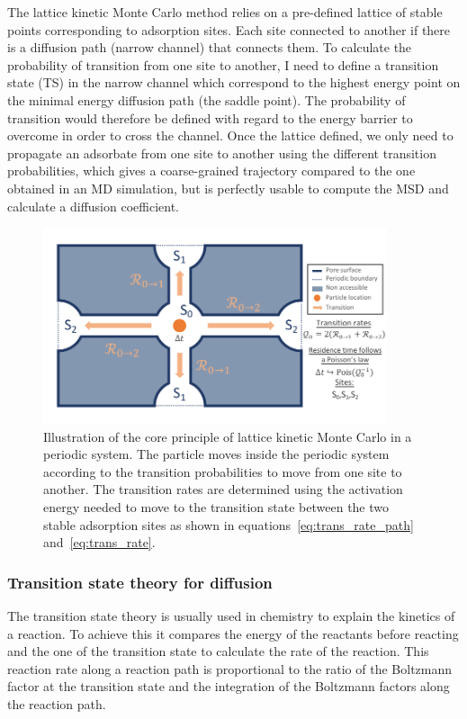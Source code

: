 \documentclass[main]{subfiles}
\begin{document}
The lattice kinetic Monte Carlo method relies on a pre-defined lattice of stable points corresponding to adsorption sites. Each site connected to another if there is a diffusion path (narrow channel) that connects them. To calculate the probability of transition from one site to another, I need to define a transition state (TS) in the narrow channel which correspond to the highest energy point on the minimal energy diffusion path (the saddle point). The probability of transition would therefore be defined with regard to the energy barrier to overcome in order to cross the channel. Once the lattice defined, we only need to propagate an adsorbate from one site to another using the different transition probabilities, which gives a coarse-grained trajectory compared to the one obtained in an MD simulation, but is perfectly usable to compute the MSD and calculate a diffusion coefficient.


\begin{figure}[ht]
  \centering
    \includegraphics[width=0.9\textwidth]{figures/5-diffusion/kinetic_MC.pdf}
    \caption{Illustration of the core principle of lattice kinetic Monte Carlo in a periodic system. The particle moves inside the periodic system according to the transition probabilities to move from one site to another. The transition rates are determined using the activation energy needed to move to the transition state between the two stable adsorption sites as shown in equations~\ref{eq:trans_rate_path} and~\ref{eq:trans_rate}. }\label{fgr:kMC_principle}
\end{figure}

\subsubsection{Transition state theory for diffusion}

The transition state theory is usually used in chemistry to explain the kinetics of a reaction. To achieve this it compares the energy of the reactants before reacting and the one of the transition state to calculate the rate of the reaction. This reaction rate along a reaction path is proportional to the ratio of the Boltzmann factor at the transition state and the integration of the Boltzmann factors along the reaction path.
\end{document}

